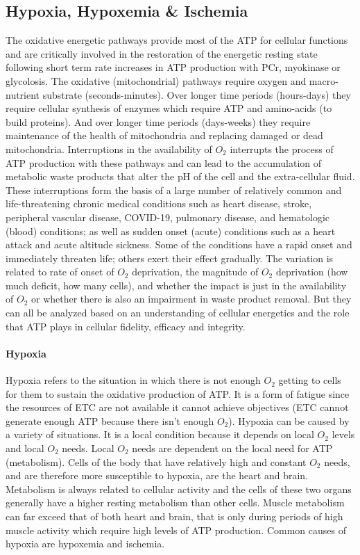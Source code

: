 \subsection{Hypoxia, Hypoxemia \& Ischemia}

The oxidative energetic pathways provide most of the ATP for cellular functions and are critically involved in the restoration of the energetic resting state following short term rate increases in ATP production with PCr, myokinase or glycolosis. The oxidative (mitochondrial) pathways require oxygen and macro-nutrient substrate (seconds-minutes). Over longer time periods (hours-days) they require cellular synthesis of enzymes which require ATP and amino-acids (to build proteins). And over longer time periods (days-weeks) they require maintenance of the health of mitochondria and replacing damaged or dead mitochondria. Interruptions in the availability of $O_2$ interrupts the process of ATP production with these pathways and can lead to the accumulation of metabolic waste products that alter the pH of the cell and the extra-cellular fluid. These interruptions form the basis of a large number of relatively common and life-threatening chronic medical conditions such as heart disease, stroke, peripheral vascular disease, COVID-19, pulmonary disease, and hematologic (blood) conditions; as well as sudden onset (acute) conditions such as a heart attack and acute altitude sickness. 
Some of the conditions have a rapid onset and immediately threaten life; others exert their effect gradually. The variation is related to rate of onset of $O_2$ deprivation, the magnitude of $O_2$ deprivation (how much deficit, how many cells), and whether the impact is just in the availability of $O_2$ or whether there is also an impairment in waste product removal. But they can all be analyzed based on an understanding of cellular energetics and the role that ATP plays in cellular fidelity, efficacy and integrity.

\paragraph{Hypoxia}
Hypoxia refers to the situation in which there is not enough $O_2$ getting to cells for them to sustain the oxidative production of ATP. It is a form of fatigue since the resources of ETC are not available it cannot achieve objectives (ETC cannot generate enough ATP because there isn't enough $O_2$). Hypoxia can be caused by a variety of situations. It is a local condition because it depends on local $O_2$ levels and local $O_2$ needs. Local $O_2$ needs are dependent on the local need for ATP (metabolism). Cells of the body that have relatively high and constant $O_2$ needs, and are therefore more susceptible to hypoxia, are the heart and brain. Metabolism is always related to cellular activity and the cells of these two organs generally have a higher resting metabolism than other cells. Muscle metabolism can far exceed that of both heart and brain, that is only during periods of high muscle activity which require high levels of ATP production. 
Common causes of hypoxia are hypoxemia and ischemia.

